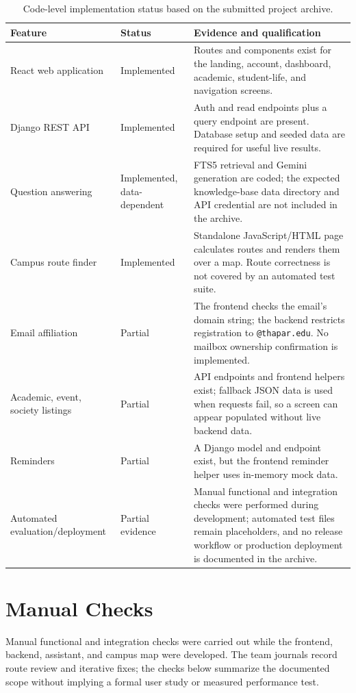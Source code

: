 \documentclass[11pt,a4paper]{report}
\begin{document}
\begin{table}[htbp]
\centering
\small
\begin{tabularx}{\linewidth}{@{}p{3.3cm}p{2.4cm}Y@{}}
\toprule
\textbf{Feature} & \textbf{Status} & \textbf{Evidence and qualification} \\
\midrule
React web application & Implemented & Routes and components exist for the landing, account, dashboard, academic, student-life, and navigation screens. \\
Django REST API & Implemented & Auth and read endpoints plus a query endpoint are present. Database setup and seeded data are required for useful live results. \\
Question answering & Implemented, data-dependent & FTS5 retrieval and Gemini generation are coded; the expected knowledge-base data directory and API credential are not included in the archive. \\
Campus route finder & Implemented & Standalone JavaScript/HTML page calculates routes and renders them over a map. Route correctness is not covered by an automated test suite. \\
Email affiliation & Partial & The frontend checks the email's domain string; the backend restricts registration to \texttt{@thapar.edu}. No mailbox ownership confirmation is implemented. \\
Academic, event, society listings & Partial & API endpoints and frontend helpers exist; fallback JSON data is used when requests fail, so a screen can appear populated without live backend data. \\
Reminders & Partial & A Django model and endpoint exist, but the frontend reminder helper uses in-memory mock data. \\
Automated evaluation/deployment & Partial evidence & Manual functional and integration checks were performed during development; automated test files remain placeholders, and no release workflow or production deployment is documented in the archive. \\
\bottomrule
\end{tabularx}
\caption{Code-level implementation status based on the submitted project archive.}
\label{tab:status}
\end{table}

\section{Manual Checks}
Manual functional and integration checks were carried out while the frontend,
backend, assistant, and campus map were developed. The team journals record
route review and iterative fixes; the checks below summarize the documented
scope without implying a formal user study or measured performance test.
\end{document}
